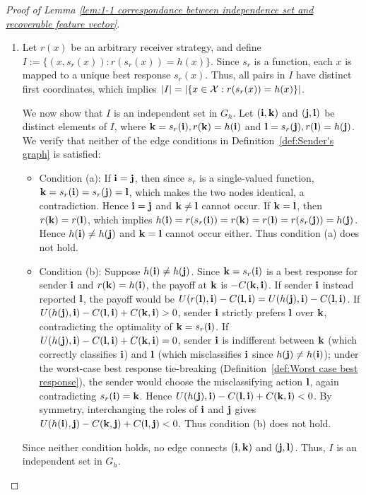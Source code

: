 \begin{proof}[Proof of Lemma \ref{lem:1-1 correspondance between independence set and recoverable feature vector}]
\begin{enumerate}[label=(\alph*)]
		Since condition (a) ensures that each such feature vector $\ibb$ appears in at most one pair in $I$, there are exactly $|I|$ distinct feature vectors represented in $I$. Hence, $|\{x \in \cg{X}: r(s_r(x)) = h(x)\}| \geq |I|$.
		
		\item Let $r(x)$ be an arbitrary receiver strategy, and define $I := \{(x,s_r(x)): r(s_r(x)) = h(x)\}$. Since $s_r$ is a function, each $x$ is mapped to a unique best response $s_r(x)$. Thus, all pairs in $I$ have distinct first coordinates, which implies $|I| = |\{x \in \mathcal{X}: r(s_r(x)) = h(x)\}|$.
		
		We now show that $I$ is an independent set in $G_h$. Let $(\mathbf{i},\mathbf{k})$ and $(\mathbf{j},\mathbf{l})$ be distinct elements of $I$, where $\mathbf{k} = s_r(\mathbf{i}), r(\mathbf{k}) = h(\mathbf{i})$ and $\mathbf{l} = s_r(\mathbf{j}), r(\mathbf{l}) = h(\mathbf{j})$. We verify that neither of the edge conditions in Definition~\ref{def:Sender's graph} is satisfied:
		\begin{itemize}
			\item Condition (a): If $\mathbf{i} = \mathbf{j}$, then since $s_r$ is a single-valued function, $\mathbf{k} = s_r(\mathbf{i}) = s_r(\mathbf{j}) = \mathbf{l}$, which makes the two nodes identical, a contradiction. Hence $\mathbf{i} = \mathbf{j}$ and $\mathbf{k} \neq \mathbf{l}$ cannot occur. If $\mathbf{k} = \mathbf{l}$, then $r(\mathbf{k}) = r(\mathbf{l})$, which implies $h(\mathbf{i}) = r(s_r(\mathbf{i})) = r(\mathbf{k}) = r(\mathbf{l}) = r(s_r(\mathbf{j})) = h(\mathbf{j})$. Hence $h(\mathbf{i}) \neq h(\mathbf{j})$ and $\mathbf{k} = \mathbf{l}$ cannot occur either. Thus condition (a) does not hold.
			\item Condition (b): Suppose $h(\mathbf{i}) \neq h(\mathbf{j})$. Since $\mathbf{k} = s_r(\mathbf{i})$ is a best response for sender $\ibb$ and $r(\mathbf{k}) = h(\mathbf{i})$, the payoff at $\mathbf{k}$ is $-C(\mathbf{k},\mathbf{i})$. If sender $\ibb$ instead reported $\mathbf{l}$, the payoff would be $U(r(\mathbf{l}),\mathbf{i}) - C(\mathbf{l},\mathbf{i}) = U(h(\mathbf{j}),\mathbf{i}) - C(\mathbf{l},\mathbf{i})$. If $U(h(\mathbf{j}),\mathbf{i}) - C(\mathbf{l},\mathbf{i}) + C(\mathbf{k},\mathbf{i}) > 0$, sender $\ibb$ strictly prefers $\mathbf{l}$ over $\mathbf{k}$, contradicting the optimality of $\mathbf{k} = s_r(\mathbf{i})$. If $U(h(\mathbf{j}),\mathbf{i}) - C(\mathbf{l},\mathbf{i}) + C(\mathbf{k},\mathbf{i}) = 0$, sender $\ibb$ is indifferent between $\mathbf{k}$ (which correctly classifies $\ibb$) and $\mathbf{l}$ (which misclassifies $\ibb$ since $h(\mathbf{j}) \neq h(\mathbf{i})$); under the worst-case best response tie-breaking (Definition~\ref{def:Worst case best response}), the sender would choose the misclassifying action $\mathbf{l}$, again contradicting $s_r(\mathbf{i}) = \mathbf{k}$. Hence $U(h(\mathbf{j}),\mathbf{i}) - C(\mathbf{l},\mathbf{i}) + C(\mathbf{k},\mathbf{i}) < 0$. By symmetry, interchanging the roles of $\ibb$ and $\mathbf{j}$ gives $U(h(\mathbf{i}),\mathbf{j}) - C(\mathbf{k},\mathbf{j}) + C(\mathbf{l},\mathbf{j}) < 0$. Thus condition (b) does not hold.
		\end{itemize}
		Since neither condition holds, no edge connects $(\mathbf{i},\mathbf{k})$ and $(\mathbf{j},\mathbf{l})$. Thus, $I$ is an independent set in $G_h$.
	\end{enumerate}
\end{proof}

